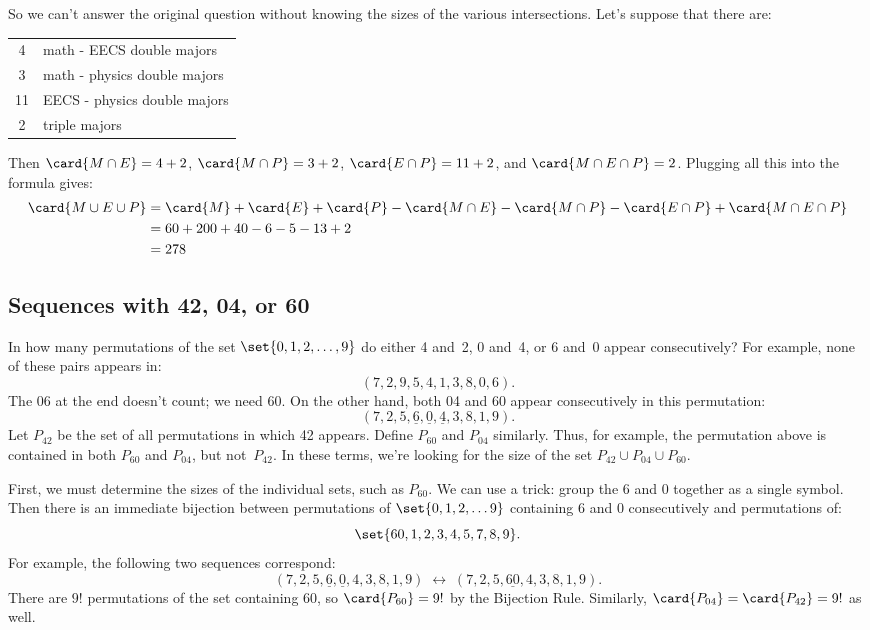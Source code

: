 So we can't answer the original question without knowing the sizes of
the various intersections.  Let's suppose that there are:
%
\begin{center}
\begin{tabular}{cl}
4 & math - EECS double majors \\
3 & math - physics double majors \\
11 & EECS - physics double majors \\
2 & triple majors
\end{tabular}
\end{center}
%
Then $\card{M \cap E} = 4 + 2$, $\card{M \cap P} = 3 + 2$, $\card{E
\cap P} = 11 + 2$, and $\card{M \cap E \cap P} = 2$.  Plugging all this
into the formula gives:
%
\begin{align*}
\card{M \cup E \cup P}
    & = \card{M} + \card{E} + \card{P}
      - \card{M \cap E} - \card{M \cap P} - \card{E \cap P}
      + \card{M \cap E \cap P} \\
    & = 60 + 200 + 40 - 6 - 5 - 13 + 2 \\
    & = 278
\end{align*}

\subsection{Sequences with 42, 04, or 60}

In how many permutations of the set $\set{0, 1, 2, \dots, 9}$ do
either 4 and~2, 0 and~4, or 6 and~0 appear consecutively?  For
example, none of these pairs appears in:
%
\[
(7, 2, 9, 5, 4, 1, 3, 8, 0, 6).
\]
%
The 06 at the end doesn't count; we need 60.  On the other hand, both
04 and 60 appear consecutively in this permutation:
%
\[
(7, 2, 5, \underline{6}, \underline{0}, \underline{4}, 3, 8, 1, 9).
\]
%
Let $P_{42}$ be the set of all permutations in which 42 appears.
Define $P_{60}$ and $P_{04}$ similarly.  Thus, for example, the
permutation above is contained in both $P_{60}$ and $P_{04}$, but
not~$P_{42}$.  In these terms, we're looking for the size of the set
$P_{42} \cup P_{04} \cup P_{60}$.

First, we must determine the sizes of the individual sets, such as
$P_{60}$.  We can use a trick: group the 6 and 0 together as a single
symbol.  Then there is an immediate bijection between permutations of
$\set{0, 1, 2, \dots 9}$ containing 6 and 0 consecutively and
permutations of:
%
\[
\set{60, 1, 2, 3, 4, 5, 7, 8, 9}.
\]
%
For example, the following two sequences correspond:
%
\[
(7, 2, 5, \underline{6}, \underline{0}, 4, 3, 8, 1, 9)
\; \longleftrightarrow \;
(7, 2, 5, \underline{60}, 4, 3, 8, 1, 9).
\]
%
There are $9!$ permutations of the set containing 60, so
$\card{P_{60}} = 9!$ by the Bijection Rule.  Similarly, $\card{P_{04}}
= \card{P_{42}} = 9!$ as well.

